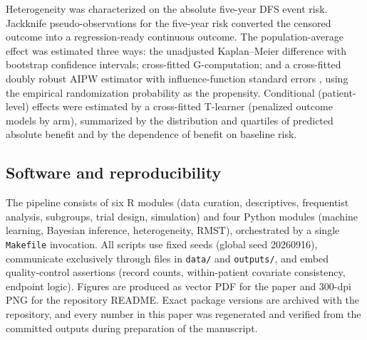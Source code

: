Heterogeneity was characterized on the absolute five-year DFS event
risk. Jackknife pseudo-observations for the five-year risk
\citep{andersen2003,parner2010} converted the censored outcome into a
regression-ready continuous outcome. The population-average effect was
estimated three ways: the unadjusted Kaplan--Meier difference with
bootstrap confidence intervals; cross-fitted G-computation; and a
cross-fitted doubly robust AIPW estimator with influence-function
standard errors \citep{hernan2020}, using the empirical randomization
probability as the propensity. Conditional (patient-level) effects were
estimated by a cross-fitted T-learner (penalized outcome models by arm),
summarized by the distribution and quartiles of predicted absolute
benefit and by the dependence of benefit on baseline risk.

\subsection{Software and reproducibility}\label{sec:methods-repro}

The pipeline consists of six R modules (data curation, descriptives,
frequentist analysis, subgroups, trial design, simulation) and four
Python modules (machine learning, Bayesian inference, heterogeneity,
RMST), orchestrated by a single \texttt{Makefile} invocation. All scripts
use fixed seeds (global seed 20260916), communicate exclusively through
files in \texttt{data/} and \texttt{outputs/}, and embed
quality-control assertions (record counts, within-patient covariate
consistency, endpoint logic). Figures are produced as vector PDF for the
paper and 300-dpi PNG for the repository README. Exact package versions
are archived with the repository, and every number in this paper was
regenerated and verified from the committed outputs during preparation
of the manuscript.
